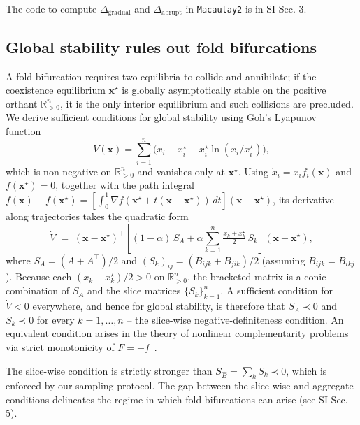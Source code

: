 \documentclass[
 reprint,
 amsmath,
 amssymb,
 aps,
 superscriptaddress,
]{revtex4-2}
\begin{document}
The code to compute $\Delta_\text{gradual}$ and $\Delta_\text{abrupt}$ in \texttt{Macaulay2} \cite{M2} is in SI Sec. 3.

\subsection*{Global stability rules out fold bifurcations}
A fold bifurcation requires two equilibria to collide and annihilate; if the coexistence equilibrium $\mathbf{x}^\star$ is globally asymptotically stable on the positive orthant $\mathbb{R}^n_{>0}$, it is the only interior equilibrium and such collisions are precluded. We derive sufficient conditions for global stability using Goh's Lyapunov function~\cite{goh_global_1977, hofbauer_evolutionary_1998, allesina_global_2026}
%
\begin{equation}
V(\mathbf{x}) = \sum_{i=1}^{n}\bigl(x_i - x_i^\star - x_i^\star \ln(x_i / x_i^\star)\bigr),
\end{equation}
%
which is non-negative on $\mathbb{R}^n_{>0}$ and vanishes only at $\mathbf{x}^\star$. Using $\dot{x}_i = x_i f_i(\mathbf{x})$ and $f(\mathbf{x}^\star) = 0$, together with the path integral $f(\mathbf{x}) - f(\mathbf{x}^\star) = [\int_0^1 \nabla f(\mathbf{x}^\star + t(\mathbf{x} - \mathbf{x}^\star))\,dt](\mathbf{x} - \mathbf{x}^\star)$, its derivative along trajectories takes the quadratic form
%
\begin{equation}
\dot{V} \;=\; (\mathbf{x}-\mathbf{x}^\star)^\top\!\left[(1-\alpha)\,S_A + \alpha\sum_{k=1}^{n}\tfrac{x_k + x_k^\star}{2}\,S_k\right]\!(\mathbf{x}-\mathbf{x}^\star),
\end{equation}
%
where $S_A = (A + A^\top)/2$ and $(S_k)_{ij} = (B_{ijk} + B_{jik})/2$ (assuming   $B_{ijk} = B_{ikj}$). Because each $(x_k + x_k^\star)/2 > 0$ on $\mathbb{R}^n_{>0}$, the bracketed matrix is a conic combination of $S_A$ and the slice matrices $\{S_k\}_{k=1}^n$. A sufficient condition for $\dot{V} < 0$ everywhere, and hence for global stability, is therefore that $S_A \prec 0$ and $S_k \prec 0$ for every $k = 1, \ldots, n$ -- the slice-wise negative-definiteness condition. An equivalent condition arises in the theory of nonlinear complementarity problems via strict monotonicity of $F = -f$~\cite{wang_nonlinear_2010}.

The slice-wise condition is strictly stronger than $S_{\hat{B}} = \sum_k S_k \prec 0$, which is enforced by our sampling protocol. The gap between the slice-wise and aggregate conditions delineates the regime in which fold bifurcations can arise (see SI Sec. 5).
\end{document}
